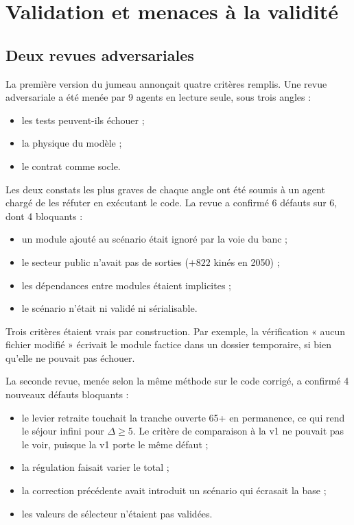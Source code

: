\section{Validation et menaces à la validité}\label{a0-sec:validation}

\subsection{Deux revues adversariales}
La première version du jumeau annonçait quatre critères remplis. Une revue adversariale a été menée
par 9 agents en lecture seule, sous trois angles :
\begin{itemize}
  \item les tests peuvent-ils échouer ;
  \item la physique du modèle ;
  \item le contrat comme socle.
\end{itemize}
Les deux constats les plus graves de chaque angle ont été soumis à un agent chargé de les réfuter
en exécutant le code. La revue a confirmé 6\mesure{} défauts sur 6, dont 4 bloquants :
\begin{itemize}
  \item un module ajouté au scénario était ignoré par la voie du banc ;
  \item le secteur public n'avait pas de sorties ($+822$\mesure{} kinés en 2050) ;
  \item les dépendances entre modules étaient implicites ;
  \item le scénario n'était ni validé ni sérialisable.
\end{itemize}
Trois critères étaient vrais par construction. Par exemple, la vérification « aucun fichier
modifié » écrivait le module factice dans un dossier temporaire, si bien qu'elle ne pouvait pas
échouer.

La seconde revue, menée selon la même méthode sur le code corrigé, a confirmé 4\mesure{} nouveaux
défauts bloquants :
\begin{itemize}
  \item le levier retraite touchait la tranche ouverte 65+ en permanence, ce qui rend le séjour
        infini pour $\Delta \ge 5$. Le critère de comparaison à la v1 ne pouvait pas le voir, puisque
        la v1 porte le même défaut ;
  \item la régulation faisait varier le total ;
  \item la correction précédente avait introduit un scénario qui écrasait la base ;
  \item les valeurs de sélecteur n'étaient pas validées.
\end{itemize}

